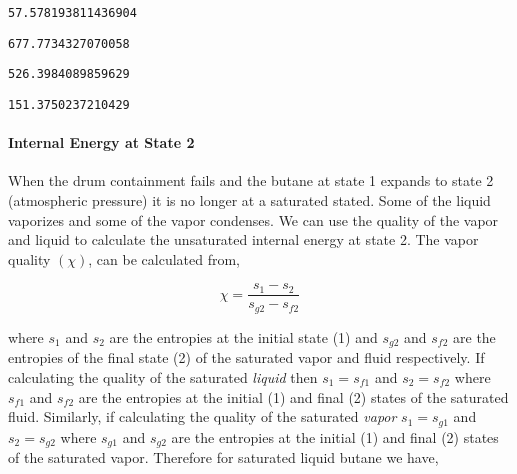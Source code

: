 \documentclass[10pt,parskip=half,
toc=sectionentrywithdots,
bibliography=totocnumbered,
captions=tableheading,numbers=noendperiod]{scrartcl}
\begin{document}
\begin{lstlisting}[language={},postbreak={},numbers=none,xrightmargin=7pt,breakindent=0pt,aboveskip=5pt,belowskip=5pt]
57.578193811436904
\end{lstlisting}

\begin{lstlisting}[language={},postbreak={},numbers=none,xrightmargin=7pt,breakindent=0pt,aboveskip=5pt,belowskip=5pt]
677.7734327070058
\end{lstlisting}

\begin{lstlisting}[language={},postbreak={},numbers=none,xrightmargin=7pt,breakindent=0pt,aboveskip=5pt,belowskip=5pt]
526.3984089859629
\end{lstlisting}

\begin{lstlisting}[language={},postbreak={},numbers=none,xrightmargin=7pt,breakindent=0pt,aboveskip=5pt,belowskip=5pt]
151.3750237210429
\end{lstlisting}

\hypertarget{internal-energy-at-state-2}{%
\paragraph{Internal Energy at State
2}\label{internal-energy-at-state-2}}

When the drum containment fails and the butane at state 1 expands to
state 2 (atmospheric pressure) it is no longer at a saturated stated.
Some of the liquid vaporizes and some of the vapor condenses. We can use
the quality of the vapor and liquid to calculate the unsaturated
internal energy at state 2. The vapor quality \((\chi)\), can be
calculated from,

\begin{equation}\chi = \frac{s_1 - s_2}{s_{g2}-s_{f2}}\end{equation}

where \(s_1\) and \(s_2\) are the entropies at the initial state (1) and
\(s_{g2}\) and \(s_{f2}\) are the entropies of the final state (2) of
the saturated vapor and fluid respectively. If calculating the quality
of the saturated \emph{liquid} then \(s_1=s_{f1}\) and \(s_2=s_{f2}\)
where \(s_{f1}\) and \(s_{f2}\) are the entropies at the initial (1) and
final (2) states of the saturated fluid. Similarly, if calculating the
quality of the saturated \emph{vapor} \(s_1=s_{g1}\) and
\(s_2 = s_{g2}\) where \(s_{g1}\) and \(s_{g2}\) are the entropies at
the initial (1) and final (2) states of the saturated vapor. Therefore
for saturated liquid butane we have,
\end{document}
